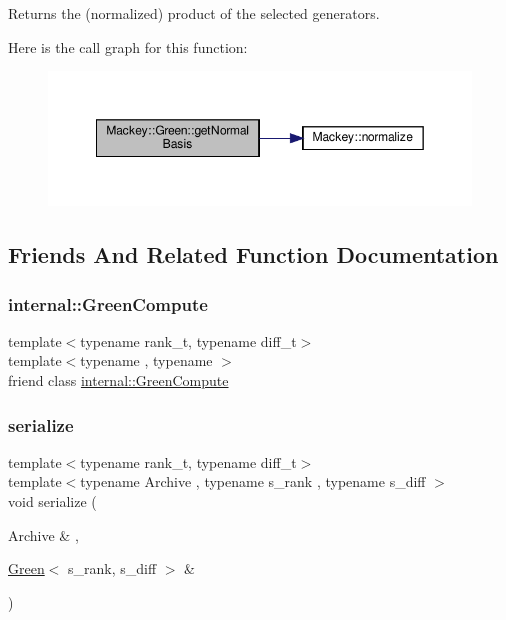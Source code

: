 Returns the (normalized) product of the selected generators. 

Here is the call graph for this function\+:\nopagebreak
\begin{figure}[H]
\begin{center}
\leavevmode
\includegraphics[width=349pt]{classMackey_1_1Green_a3f7f1f3a020f23a00fae372956f50827_cgraph}
\end{center}
\end{figure}


\subsection{Friends And Related Function Documentation}
\mbox{\label{classMackey_1_1Green_aa7a5b52d9d87397db413615120f34df7}} 
\subsubsection{\texorpdfstring{internal\+::\+Green\+Compute}{internal::GreenCompute}}
{\footnotesize\ttfamily template$<$typename rank\+\_\+t, typename diff\+\_\+t$>$ \\
template$<$typename , typename $>$ \\
friend class \hyperlink{classMackey_1_1internal_1_1GreenCompute}{internal\+::\+Green\+Compute}\hspace{0.3cm}{\ttfamily [friend]}}

\mbox{\label{classMackey_1_1Green_aeb72946219f32efa8f0a45f5f8872c8a}} 
\subsubsection{\texorpdfstring{serialize}{serialize}}
{\footnotesize\ttfamily template$<$typename rank\+\_\+t, typename diff\+\_\+t$>$ \\
template$<$typename Archive , typename s\+\_\+rank , typename s\+\_\+diff $>$ \\
void serialize (\begin{DoxyParamCaption}\item[{Archive \&}]{,  }\item[{\hyperlink{classMackey_1_1Green}{Green}$<$ s\+\_\+rank, s\+\_\+diff $>$ \&}]{ }\end{DoxyParamCaption})\hspace{0.3cm}{\ttfamily [friend]}}




